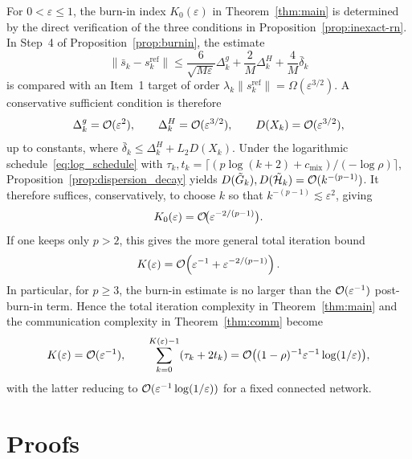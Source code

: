 \documentclass[review,onefignum,onetabnum]{siamart171218}
\begin{document}
	\begin{remark}\label{rem:burnin_order_app}
		For $0<\varepsilon\le1$, the burn-in index
		$K_0(\varepsilon)$ in Theorem~\ref{thm:main} is determined by
		the direct verification of the three conditions in
		Proposition~\ref{prop:inexact-rn}.
		In Step~4 of Proposition~\ref{prop:burnin}, the estimate
		\[
		\|\bar s_k-s_k^{\mathrm{ref}}\|
		\le
		\frac{6}{\sqrt{M\varepsilon}}\Delta_k^g
		+\frac{2}{M}\Delta_k^H
		+\frac{4}{M}\bar\delta_k
		\]
		is compared with an Item~1 target of order
		$\lambda_k\|s_k^{\mathrm{ref}}\|=\Omega(\varepsilon^{3/2})$.
		A conservative sufficient condition is therefore
		\[
		\Delta_k^g=\mathcal{O}(\varepsilon^2),\qquad
		\Delta_k^H=\mathcal{O}(\varepsilon^{3/2}),\qquad
		D(X_k)=\mathcal{O}(\varepsilon^{3/2}),
		\]
		up to constants, where
		$\bar\delta_k\le \Delta_k^H+L_2D(X_k)$.
		Under the logarithmic schedule~\eqref{eq:log_schedule} with
		$\tau_k,t_k=\lceil(p\log(k+2)+c_{\mathrm{mix}})/(-\log\rho)\rceil$,
		Proposition~\ref{prop:dispersion_decay} yields
		$D(\tilde G_k),D(\tilde{\mathcal H}_k)=\mathcal{O}(k^{-(p-1)})$.
		It therefore suffices, conservatively, to choose $k$ so that
		$k^{-(p-1)}\lesssim\varepsilon^2$, giving
		\[
		K_0(\varepsilon)=\mathcal{O}\!\big(\varepsilon^{-2/(p-1)}\big).
		\]
		If one keeps only $p>2$, this gives the more general total
		iteration bound
		\[
		K(\varepsilon)
		=\mathcal{O}\!\left(\varepsilon^{-1}+\varepsilon^{-2/(p-1)}\right).
		\]
		In particular, for $p\ge3$, the burn-in estimate is no larger than
		the $\mathcal{O}(\varepsilon^{-1})$ post-burn-in term. Hence the total
		iteration complexity in Theorem~\ref{thm:main} and the communication
		complexity in Theorem~\ref{thm:comm} become
		\[
		K(\varepsilon)=\mathcal{O}(\varepsilon^{-1}),
		\qquad
		\sum_{k=0}^{K(\varepsilon)-1}(\tau_k+2t_k)
		=\mathcal{O}\bigl((1-\rho)^{-1}\varepsilon^{-1}\log(1/\varepsilon)\bigr),
		\]
		with the latter reducing to
		$\mathcal{O}(\varepsilon^{-1}\log(1/\varepsilon))$ for a fixed connected
		network.
	\end{remark}
	
	
	\section{Proofs}\label{app:proofs}
	
\end{document}
